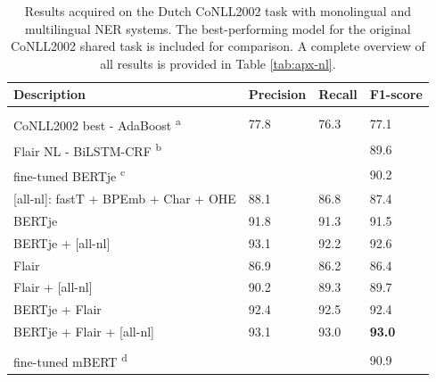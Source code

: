 \documentclass[12pt,a4paper,]{book}
\begin{document}
\begin{table}

\caption{\label{tab:conll2002-tab}Results acquired on the Dutch CoNLL2002 task with monolingual and multilingual NER systems. The best-performing model for the original CoNLL2002 shared task \citep{carreras2002} is included for comparison. A complete overview of all results is provided in Table \ref{tab:apx-nl}.}
\centering
\begin{tabular}[t]{llll}
\toprule
Description & Precision & Recall & F1-score\\
\midrule
\addlinespace[0.3em]
\multicolumn{4}{l}{\textbf{Monolingual}}\\
\textcolor[HTML]{999999}{\hspace{1em}CoNLL2002 best - AdaBoost \textsuperscript{a}} & \textcolor[HTML]{999999}{77.8} & \textcolor[HTML]{999999}{76.3} & \textcolor[HTML]{999999}{77.1}\\
\textcolor[HTML]{999999}{\hspace{1em}Flair NL - BiLSTM-CRF \textsuperscript{b}} & \textcolor[HTML]{999999}{} & \textcolor[HTML]{999999}{} & \textcolor[HTML]{999999}{89.6}\\
\textcolor[HTML]{999999}{\hspace{1em}fine-tuned BERTje \textsuperscript{c}} & \textcolor[HTML]{999999}{} & \textcolor[HTML]{999999}{} & \textcolor[HTML]{999999}{90.2}\\
\hspace{1em}[all-nl]: fastT + BPEmb + Char + OHE & 88.1 & 86.8 & 87.4\\
\hspace{1em}BERTje & 91.8 & 91.3 & 91.5\\
\hspace{1em}BERTje + [all-nl] & 93.1 & 92.2 & 92.6\\
\hspace{1em}Flair & 86.9 & 86.2 & 86.4\\
\hspace{1em}Flair + [all-nl] & 90.2 & 89.3 & 89.7\\
\hspace{1em}BERTje + Flair & 92.4 & 92.5 & 92.4\\
\hspace{1em}BERTje + Flair + [all-nl] & 93.1 & 93.0 & \textbf{93.0}\\
\addlinespace[0.3em]
\multicolumn{4}{l}{\textbf{Multilingual}}\\
\textcolor[HTML]{999999}{\hspace{1em}fine-tuned mBERT \textsuperscript{d}} & \textcolor[HTML]{999999}{} & \textcolor[HTML]{999999}{} & \textcolor[HTML]{999999}{90.9}\\

\end{tabular}
\end{table}
\end{document}
